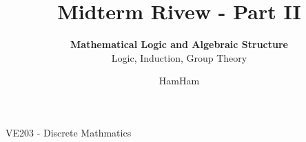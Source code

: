 \documentclass{beamer}
\title{\sffamily Midterm Rivew -  Part II}
\subtitle{\textbf{Mathematical Logic and Algebraic Structure}\\Logic, Induction, Group Theory}
\institute[UM-SJTU JI]{University of Michigan-Shanghai Jiao Tong University Joint Institute}
\author{HamHam}
\newcommand{\myfont}{\rmfamily\normalsize\upshape\mdseries}
\begin{document}
\begin{titlepage}
    \begin{center}
        VE203 - Discrete Mathmatics 
    \end{center}
\end{titlepage}
\myfont
\newcommand{\binomial}[2]{\begin{pmatrix} {#1}\\{#2}	\end{pmatrix}}
\newcommand{\green}[1]{\textcolor[rgb]{0.3,0.6,0}{#1}}
\end{document}
